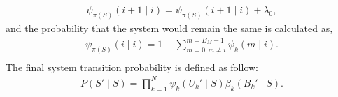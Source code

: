 \documentclass[conference]{IEEEtran}
\begin{document}
\begin{equation}
\begin{aligned}
\psi_{\pi(S)}(i+1 \mid i) = \psi_{\pi(S)}(i+1 \mid i) + \lambda_0,
\end{aligned}
\end{equation}
and the probability that the system would remain the same is calculated as,
\begin{equation}
\begin{aligned}
\psi_{\pi(S)}(i \mid i) = 1 - \sum\nolimits_{m=0, m\ne i}^{m = B_{M} -1}\psi_{k}(m\mid i).\\ %
\end{aligned}
\end{equation}
The final system transition probability is defined as follow:
\begin{equation}
\begin{aligned}
P(S'\mid S) = \prod\limits_{k=1}^N \psi_{k}(U_k' \mid S)\beta_{k}(B_k' \mid S).
\end{aligned}
\end{equation}
\end{document}
